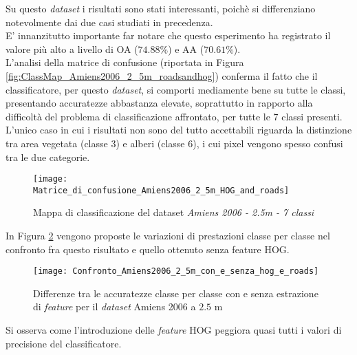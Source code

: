 Su questo \emph{dataset} i risultati sono stati interessanti, poichè
si differenziano notevolmente dai due casi studiati in precedenza.\\

E' innanzitutto importante far notare che questo esperimento ha
registrato il valore più alto a livello di OA ($74.88\%$) e AA
($70.61\%$). \\

L'analisi della matrice di confusione (riportata in Figura
\ref{fig:ClassMap_Amiens2006_2_5m_roadsandhog}) conferma il fatto che
il classificatore, per questo \emph{dataset}, si comporti mediamente
bene su tutte le classi, presentando accuratezze abbastanza elevate,
soprattutto in rapporto alla difficoltà del problema di
classificazione affrontato, per tutte le 7 classi presenti.\\L'unico
caso in cui i risultati non sono del tutto accettabili riguarda la
distinzione tra area vegetata (classe 3) e alberi (classe 6), i cui
pixel vengono spesso confusi tra le due categorie.

\begin{figure}[!ht]

\texttt{[image: Matrice\_di\_confusione\_Amiens2006\_2\_5m\_HOG\_and\_roads]}

\caption{Mappa di classificazione del dataset \emph{Amiens 2006 - 2.5m
- 7 classi}}

\label{fig:Matrice_di_confusione_Amiens2006_2_5m_HOG_and_roads}

\end{figure}

In Figura \ref{fig:Confronto_Amiens2006_2_5m_con_e_senza_hog_e_roads}
vengono proposte le variazioni di prestazioni classe per classe nel
confronto fra questo risultato e quello ottenuto senza feature HOG.\\

\begin{figure}[!ht]

\texttt{[image: Confronto\_Amiens2006\_2\_5m\_con\_e\_senza\_hog\_e\_roads]}

\caption{Differenze tra le accuratezze classe per classe con e
senza estrazione di \emph{feature} per il \emph{dataset} Amiens 2006 a
$2.5$ m}

\label{fig:Confronto_Amiens2006_2_5m_con_e_senza_hog_e_roads}

\end{figure}

Si osserva come l'introduzione delle \emph{feature} HOG peggiora quasi
tutti i valori di precisione del classificatore.\\

